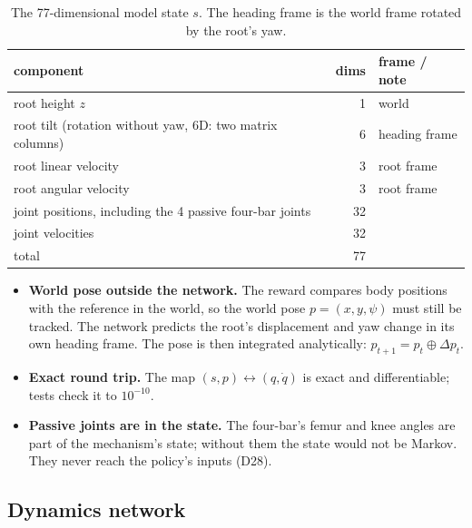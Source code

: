 \documentclass[10pt]{article}
\begin{document}
\begin{table}[H]
\centering\small
\caption{The 77-dimensional model state $s$. The heading frame is the world frame rotated by the root's
yaw.}
\label{tab:state}
\begin{tabular}{lrl}\toprule
component & dims & frame / note \\\midrule
root height $z$ & 1 & world \\
root tilt (rotation without yaw, 6D: two matrix columns) & 6 & heading frame \\
root linear velocity & 3 & root frame \\
root angular velocity & 3 & root frame \\
joint positions, including the 4 passive four-bar joints & 32 & \\
joint velocities & 32 & \\\midrule
total & 77 & \\\bottomrule
\end{tabular}
\end{table}

\begin{itemize}
  \item \textbf{World pose outside the network.} The reward compares body positions with the
  reference in the world, so the world pose $p = (x, y, \psi)$ must still be tracked. The network
  predicts the root's displacement and yaw change in its own heading frame. The pose is then integrated
  analytically: $p_{t+1} = p_t \oplus \Delta p_t$.
  \item \textbf{Exact round trip.} The map $(s, p) \leftrightarrow (q, \dot q)$ is exact and
  differentiable; tests check it to $10^{-10}$.
  \item \textbf{Passive joints are in the state.} The four-bar's femur and knee angles are part of the
  mechanism's state; without them the state would not be Markov. They never reach the policy's
  inputs (D28).
\end{itemize}

\subsection{Dynamics network}
\end{document}
